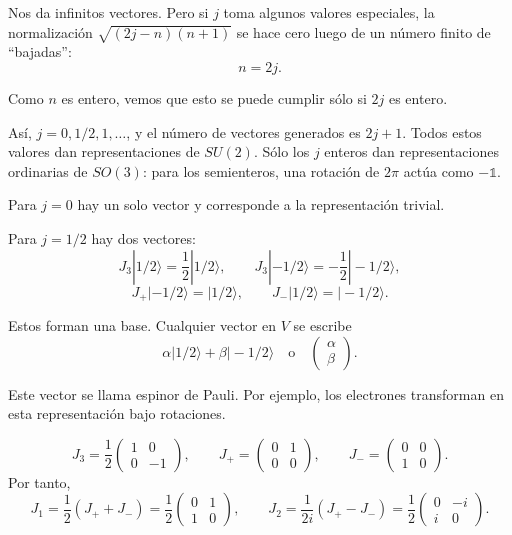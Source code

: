 \documentclass[11pt,a4paper]{article}
\newcommand{\concept}[1]{\textcolor{concept-green}{#1}}
\begin{document}
Nos da infinitos vectores. Pero si $j$ toma algunos valores especiales, la normalización $\sqrt{(2j-n)(n+1)}$ se hace cero luego de un número finito de ``bajadas'':
\[
  n=2j.
\]

Como $n$ es entero, vemos que esto se puede cumplir sólo si $2j$ es entero.

Así, $j=0,1/2,1,\ldots$, y el número de vectores generados es $2j+1$.
Todos estos valores dan representaciones de $SU(2)$. Sólo los $j$ enteros
dan representaciones ordinarias de $SO(3)$: para los semienteros,
una rotación de $2\pi$ actúa como $-\mathbb1$.

Para $j=0$ hay un solo vector y corresponde a la representación trivial.

Para $j=1/2$ hay dos vectores:
\[
  J_3|1/2\rangle=\frac12|1/2\rangle,
  \qquad
  J_3|-1/2\rangle=-\frac12|-1/2\rangle,
\]
\[
  J_+|-1/2\rangle=|1/2\rangle,
  \qquad
  J_-|1/2\rangle=|-1/2\rangle.
\]

Estos forman una base. Cualquier vector en $V$ se escribe
\[
  \alpha|1/2\rangle+\beta|-1/2\rangle
  \quad\text{o}\quad
  \begin{pmatrix}\alpha\\ \beta\end{pmatrix}.
\]

Este vector se llama \concept{espinor de Pauli}. Por ejemplo, los electrones transforman en esta representación bajo rotaciones.

\[
  J_3=\frac12
  \begin{pmatrix}
    1&0\\
    0&-1
  \end{pmatrix},
  \qquad
  J_+=
  \begin{pmatrix}
    0&1\\
    0&0
  \end{pmatrix},
  \qquad
  J_-=
  \begin{pmatrix}
    0&0\\
    1&0
  \end{pmatrix}.
\]
Por tanto,
\[
  J_1=\frac12(J_++J_-)
  =\frac12
  \begin{pmatrix}
    0&1\\
    1&0
  \end{pmatrix},
  \qquad
  J_2=\frac{1}{2i}(J_+-J_-)
  =\frac12
  \begin{pmatrix}
    0&-i\\
    i&0
  \end{pmatrix}.
\]
\end{document}
